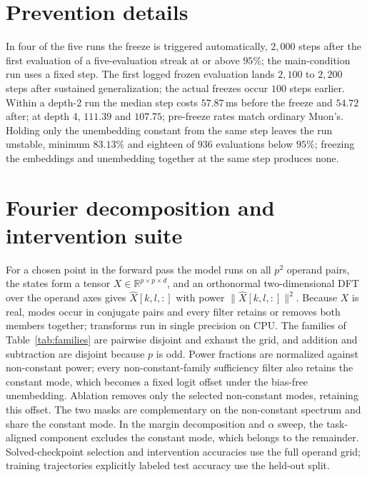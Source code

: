 \section{Prevention details}
\label{app:prevention}



In four of the five runs the freeze is triggered automatically, $2{,}000$ steps after the first evaluation of a five-evaluation streak at or above $95\%$; the main-condition run uses a fixed step. The first logged frozen evaluation lands $2{,}100$ to $2{,}200$ steps after sustained generalization; the actual freezes occur $100$ steps earlier. Within a depth-2 run the median step costs $57.87$\,ms before the freeze and $54.72$ after; at depth 4, $111.39$ and $107.75$; pre-freeze rates match ordinary Muon's. Holding only the unembedding constant from the same step leaves the run unstable, minimum $83.13\%$ and eighteen of $936$ evaluations below $95\%$; freezing the embeddings and unembedding together at the same step produces none.

\section{Fourier decomposition and intervention suite}
\label{app:fourier}





For a chosen point in the forward pass the model runs on all $p^2$ operand pairs, the states form a tensor $X\in\mathbb{R}^{p\times p\times d}$, and an orthonormal two-dimensional DFT over the operand axes gives $\widehat{X}[k,l,:]$ with power $\lVert\widehat{X}[k,l,:]\rVert^2$. Because $X$ is real, modes occur in conjugate pairs and every filter retains or removes both members together; transforms run in single precision on CPU. The families of Table~\ref{tab:families} are pairwise disjoint and exhaust the grid, and addition and subtraction are disjoint because $p$ is odd. Power fractions are normalized against non-constant power; every non-constant-family sufficiency filter also retains the constant mode, which becomes a fixed logit offset under the bias-free unembedding. Ablation removes only the selected non-constant modes, retaining this offset. The two masks are complementary on the non-constant spectrum and share the constant mode. In the margin decomposition and $\alpha$ sweep, the task-aligned component excludes the constant mode, which belongs to the remainder. Solved-checkpoint selection and intervention accuracies use the full operand grid; training trajectories explicitly labeled test accuracy use the held-out split.

